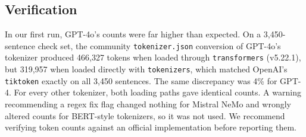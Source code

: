 \documentclass[conference]{IEEEtran}
\begin{document}
\subsection{Verification}\label{sec:verify}
In our first run, GPT-4o's counts were far higher than expected. On a 3,450-sentence check set, the community \texttt{tokenizer.json} conversion of GPT-4o's tokenizer produced 466,327 tokens when loaded through \texttt{transformers} (v5.22.1), but 319,957 when loaded directly with \texttt{tokenizers}, which matched OpenAI's \texttt{tiktoken} exactly on all 3,450 sentences. The same discrepancy was 4\% for GPT-4. For every other tokenizer, both loading paths gave identical counts. A warning recommending a regex fix flag changed nothing for Mistral NeMo and wrongly altered counts for BERT-style tokenizers, so it was not used. We recommend verifying token counts against an official implementation before reporting them.
\end{document}

